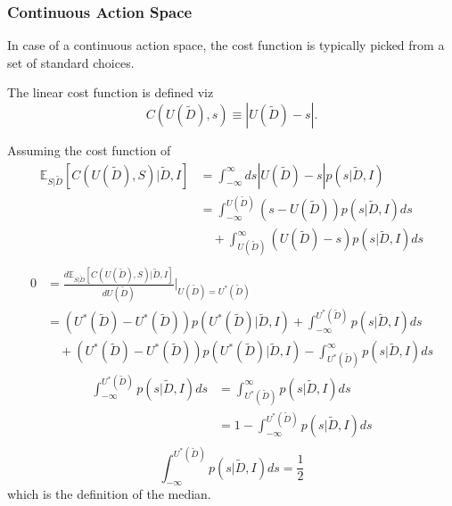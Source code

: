 \subsubsection{Continuous Action Space}
In case of a continuous action space, the cost function is typically picked from a set of standard choices.	
\begin{definition}
	\label{def:linear_cost_function}
	The linear cost function is defined viz
	\begin{equation}
		C(U(\tilde{D}),s) \equiv |U(\tilde{D})-s|.
	\end{equation}
	
\end{definition}
\begin{theorem}
	Assuming the cost function of 
	\begin{equation}
		\begin{split}
			\mathbb{E}_{S|\tilde{D}}[C(U(\tilde{D}), S)|\tilde{D},I] &= \int_{-\infty}^{\infty} ds |U(\tilde{D})-s| p(s|\tilde{D},I)\\
			&= \int_{-\infty}^{U(\tilde{D})} (s-U(\tilde{D}))p(s|\tilde{D},I)ds\\
			&\quad+\int_{U(\tilde{D})}^\infty (U(\tilde{D})-s)p(s|\tilde{D},I)ds\\
		\end{split}
	\end{equation}
	\begin{equation}
		\begin{split}
			0 &=\frac{d \mathbb{E}_{S|\tilde{D}}[C(U(\tilde{D}), S)|\tilde{D},I]}{dU(\tilde{D})}\bigg|_{U(\tilde{D})=U^*(\tilde{D})}\\
			&= (U^*(\tilde{D})-U^*(\tilde{D}))p(U^*(\tilde{D})|\tilde{D},I)+\int_{-\infty}^{U^*(\tilde{D})} p(s|\tilde{D},I)ds\\
			&\quad+(U^*(\tilde{D})-U^*(\tilde{D}))p(U^*(\tilde{D})|\tilde{D},I)-\int_{U^*(\tilde{D})}^\infty p(s|\tilde{D},I)ds
		\end{split}
	\end{equation}
	\begin{equation}
		\begin{split}
			\int_{-\infty}^{U^*(\tilde{D})} p(s|\tilde{D},I)ds &= \int_{U^*(\tilde{D})}^\infty p(s|\tilde{D},I)ds\\
			&= 1- \int_{-\infty}^{U^*(\tilde{D})} p(s|\tilde{D},I)ds\\
		\end{split}
	\end{equation}
	\begin{equation}
		\int_{-\infty}^{U^*(\tilde{D})} p(s|\tilde{D},I)ds = \frac{1}{2}
	\end{equation}
	which is the definition of the median.
\end{theorem}

